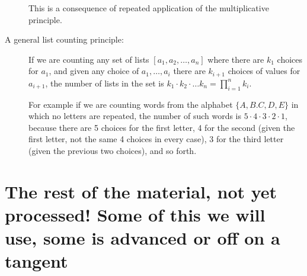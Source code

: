 \documentclass[12pt]{article}
\begin{document}
\begin{description}
This is a consequence of repeated application of the multiplicative principle.

\item[A general list counting principle:]  If we are counting any set of lists $[a_1,a_2,\ldots,a_n]$ where there are $k_1$ choices for $a_1$, and given any choice of $a_1,\ldots,a_i$ there are $k_{i+1}$ choices of values for $a_{i+1}$, the
number of lists in the set is $k_1\cdot k_2 \cdot \ldots k_n= \prod_{i=1}^nk_i$.

For example if we are counting words from the alphabet $\{A,B.C,D,E\}$ in which no letters are repeated,
the number of such words is $5 \cdot 4\cdot 3\cdot 2\cdot 1$, because there are 5 choices for the first letter,
4 for the second (given the first letter, not the same 4 choices in every case), 3 for the third letter (given the previous two choices), and so forth.

\end{description}

\newpage

\section{The rest of the material, not yet processed!  Some of this we will use, some is advanced or off on a tangent}
\end{document}
